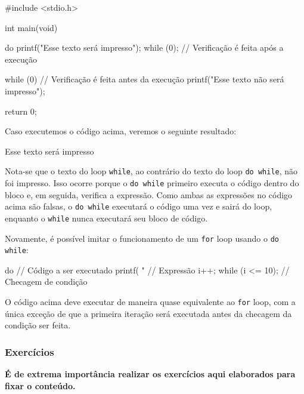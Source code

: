 \begin{excode}
    #include <stdio.h>

    int main(void)
    {
        do {
            printf("Esse texto será impresso\n");
        } while (0); // Verificação é feita após a execução

        while (0) { // Verificação é feita antes da execução
            printf("Esse texto não será impresso\n");
        }

        return 0;
    }
\end{excode}

Caso executemos o código acima, veremos o seguinte resultado:

\begin{textbox}
    Esse texto será impresso
\end{textbox}

Nota-se que o texto do loop \texttt{while}, ao contrário do texto do loop 
\texttt{do while}, não foi impresso. Isso ocorre porque o \texttt{do while} 
primeiro executa o código dentro do bloco e, em seguida, verifica a expressão. 
Como ambas as expressões no código acima são falsas, o \texttt{do while} 
executará o código uma vez e sairá do loop, enquanto o \texttt{while} 
nunca executará seu bloco de código.

Novamente, é possível imitar o funcionamento de um \texttt{for} 
loop usando o \texttt{do while}:

\begin{excode}
    do
    {
        //  Código a ser executado
        printf( "%
        // Expressão
        i++;
    }  while (i <= 10); // Checagem de condição 
\end{excode}

O código acima deve executar de maneira quase equivalente ao \texttt{for} loop, com a 
única exceção de que a primeira iteração será executada antes da checagem da condição 
ser feita.

\subsubsection{Exercícios}

\textbf{É de extrema importância realizar os exercícios aqui elaborados 
para fixar o conteúdo.}

